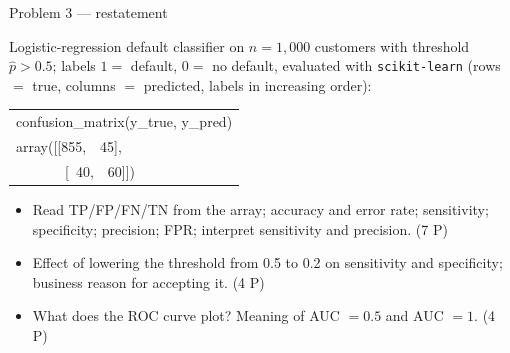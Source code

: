 \documentclass[aspectratio=169,11pt]{beamer}
\begin{document}
\begin{frame}{Problem 3 --- restatement}
  \begin{exercise}
    Logistic-regression default classifier on $n=1{,}000$ customers with threshold
    $\hat{p}>0.5$; labels $1=$ default, $0=$ no default, evaluated with \texttt{scikit-learn}
    (rows $=$ true, columns $=$ predicted, labels in increasing order):
    \begin{center}\footnotesize
    \begin{tabular}{@{}l@{}}
      \toprule
      \ttfamily confusion\_matrix(y\_true, y\_pred)\\
      \ttfamily array([[855,\ \ 45],\\
      \ttfamily \ \ \ \ \ \ \ [\ 40,\ \ 60]])\\
      \bottomrule
    \end{tabular}
    \end{center}
    \begin{itemize}
      \item[(a)] Read TP/FP/FN/TN from the array; accuracy and error rate; sensitivity;
        specificity; precision; FPR; interpret sensitivity and precision. \hfill (7 P)
      \item[(b)] Effect of lowering the threshold from 0.5 to 0.2 on sensitivity and
        specificity; business reason for accepting it. \hfill (4 P)
      \item[(c)] What does the ROC curve plot? Meaning of AUC $=0.5$ and AUC $=1$. \hfill (4 P)
    \end{itemize}
  \end{exercise}
\end{frame}
\end{document}
